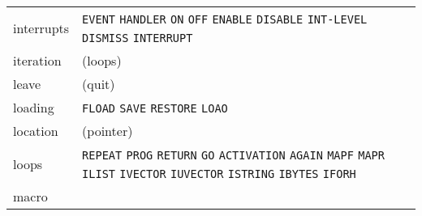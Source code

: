 \documentclass[a4paper]{scrbook}
\begin{document}
\begin{longtable}[]{@{}ll@{}}
\begin{minipage}[t]{0.11\columnwidth}\raggedright\strut
interrupts\strut
\end{minipage} & \begin{minipage}[t]{0.83\columnwidth}\raggedright\strut
\texttt{EVENT} \texttt{HANDLER} \texttt{ON} \texttt{OFF} \texttt{ENABLE} \texttt{DISABLE} \texttt{INT-LEVEL}
\texttt{DISMISS} \texttt{INTERRUPT}\strut
\end{minipage}\tabularnewline
\begin{minipage}[t]{0.11\columnwidth}\raggedright\strut
iteration\strut
\end{minipage} & \begin{minipage}[t]{0.83\columnwidth}\raggedright\strut
(loops)\strut
\end{minipage}\tabularnewline
\begin{minipage}[t]{0.11\columnwidth}\raggedright\strut
leave\strut
\end{minipage} & \begin{minipage}[t]{0.83\columnwidth}\raggedright\strut
(quit)\strut
\end{minipage}\tabularnewline
\begin{minipage}[t]{0.11\columnwidth}\raggedright\strut
loading\strut
\end{minipage} & \begin{minipage}[t]{0.83\columnwidth}\raggedright\strut
\texttt{FLOAD} \texttt{SAVE} \texttt{RESTORE} \texttt{LOAO}\strut
\end{minipage}\tabularnewline
\begin{minipage}[t]{0.11\columnwidth}\raggedright\strut
location\strut
\end{minipage} & \begin{minipage}[t]{0.83\columnwidth}\raggedright\strut
(pointer)\strut
\end{minipage}\tabularnewline
\begin{minipage}[t]{0.11\columnwidth}\raggedright\strut
loops\strut
\end{minipage} & \begin{minipage}[t]{0.83\columnwidth}\raggedright\strut
\texttt{REPEAT} \texttt{PROG} \texttt{RETURN} \texttt{GO} \texttt{ACTIVATION} \texttt{AGAIN} \texttt{MAPF} \texttt{MAPR}
\texttt{ILIST} \texttt{IVECTOR} \texttt{IUVECTOR} \texttt{ISTRING} \texttt{IBYTES} \texttt{IFORH}\strut
\end{minipage}\tabularnewline
\begin{minipage}[t]{0.11\columnwidth}\raggedright\strut
macro\strut
\end{minipage} & \begin{minipage}[t]{0.83\columnwidth}\raggedright\strut

\end{minipage}
\end{longtable}
\end{document}
